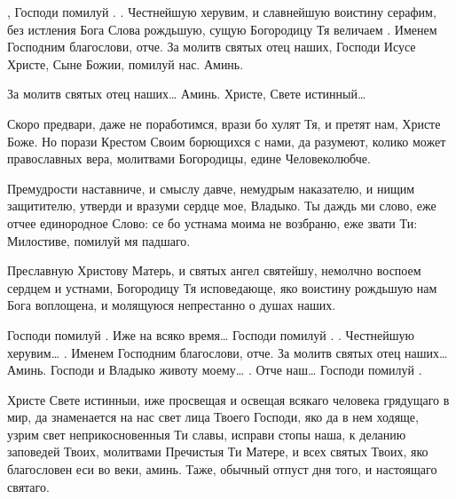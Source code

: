 \begin{mymulticols}
, Господи помилуй . . Честнейшую херувим, и славнейшую воистину серафим, без истления Бога Слова рождьшую, сущую Богородицу Тя величаем . Именем Господним благослови, отче. За молитв святых отец наших, Господи Исусе Христе, Сыне Божии, помилуй нас. Аминь.


 За молитв святых отец наших…  Аминь.  Христе, Свете истинный… 

 Скоро предвари, даже не поработимся, врази бо хулят Тя, и претят нам, Христе Боже. Но порази Крестом Своим борющихся с нами, да разумеют, колико может православных вера, молитвами Богородицы, едине Человеколюбче.

 Премудрости наставниче, и смыслу давче, немудрым наказателю, и нищим защитителю, утверди и вразуми сердце мое, Владыко. Ты даждь ми слово, еже отчее единородное Слово: се бо устнама моима не возбраню, еже звати Ти: Милостиве, помилуй мя падшаго.

 Преславную Христову Матерь, и святых ангел святейшу, немолчно воспоем сердцем и устнами, Богородицу Тя исповедающе, яко воистину рождьшую нам Бога воплощена, и молящуюся непрестанно о душах наших. 

Господи помилуй . Иже на всяко время… Господи помилуй . . Честнейшую херувим… . Именем Господним благослови, отче. За молитв святых отец наших… Аминь.  Господи и Владыко животу моему…  .  Отче наш… Господи помилуй .


 Христе Свете истинныи, иже просвещая и освещая всякаго человека грядущаго в мир, да знаменается на нас свет лица Твоего Господи, яко да в нем ходяще, узрим свет неприкосновенныя Ти славы, исправи стопы наша, к деланию заповедей Твоих, молитвами Пречистыя Ти Матере, и всех святых Твоих, яко благословен еси во веки, аминь. Таже, обычный отпуст дня того, и настоящаго святаго.


\end{mymulticols}


